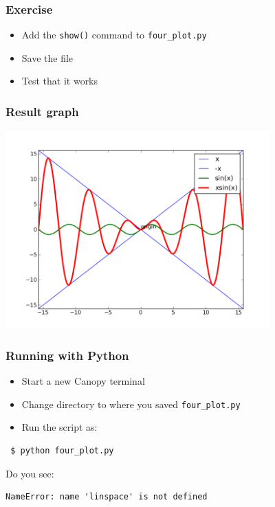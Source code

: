\documentclass[14pt,compress]{beamer}
\newcounter{time}
\newcommand{\inctime}[1]{\addtocounter{time}{#1}{\tiny \thetime\ m}}
\newcommand{\typ}[1]{\lstinline{#1}}
\begin{document}
\begin{frame}[fragile]
  \frametitle{Exercise}
  \begin{itemize}
  \item Add the \typ{show()} command to \typ{four_plot.py}
  \item Save the file
  \item Test that it works
  \end{itemize}
\end{frame}

\begin{frame}[fragile]
  \frametitle{Result graph}
  \begin{center}
    \includegraphics[height=3in, interpolate=true]{data/four_plot}
  \end{center}
\end{frame}

\begin{frame}[fragile]
  \frametitle{Running with Python}
  \begin{itemize}
  \item Start a new Canopy terminal
  \item Change directory to where you saved \typ{four_plot.py}
  \item Run the script as:
  \end{itemize}
\begin{lstlisting}
 $ python four_plot.py
\end{lstlisting}
  \pause
  Do you see:
  \begin{small}
\begin{lstlisting}
NameError: name 'linspace' is not defined
\end{lstlisting}
  \end{small}
\inctime{5}
\end{frame}
\end{document}
